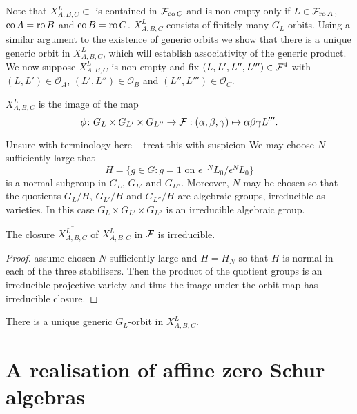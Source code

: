 \documentclass[a4paper, 11pt]{report}
\begin{document}
Note that $X_{A,B,C}^L\subset$ is contained in $\mathcal{F}_{\operatorname{co}{C}}$ and is non-empty only if $L\in\mathcal{F}_{\operatorname{ro}{A}}$, $\operatorname{co}{A}=\operatorname{ro}{B}$ and $\operatorname{co}{B}=\operatorname{ro}{C}$. $X_{A,B,C}^L$ consists of finitely many $G_L$-orbits. Using a similar argument to the existence of generic orbits we show that there is a unique generic orbit in $X_{A,B,C}^L$, which will establish associativity of the generic product. We now suppose $X_{A,B,C}^L$ is non-empty and fix $(L,L',L'',L''')\in\mathcal{F}^4$ with $(L,L')\in\mathcal{O}_A$, $(L',L'')\in\mathcal{O}_B$ and $(L'',L''')\in\mathcal{O}_C$.

\begin{lemma}
$X_{A,B,C}^L$ is the image of the map
\begin{equation*}
\phi\colon G_L\times G_{L'}\times G_{L''}\to \mathcal{F}: (\alpha,\beta,\gamma)\mapsto \alpha\beta\gamma L'''.
\end{equation*}
\end{lemma}

\begin{lemma}
{\color{red} Unsure with terminology here -- treat this with suspicion}
We may choose $N$ sufficiently large that
\begin{equation*}
H = \{g\in G: g=1 \text{ on } \epsilon^{-N}L_0/{\epsilon^N L_0}\}
\end{equation*}
is a normal subgroup in $G_L$, $G_{L'}$ and $G_{L''}$. Moreover, $N$ may be chosen so that the quotients $G_L/H$, $G_{L'}/H$ and $G_{L''}/H$ are algebraic groups, irreducible as varieties. In this case $G_L\times G_{L'}\times G_{L''}$ is an irreducible algebraic group.
\end{lemma}

\begin{proposition}
The closure $\overline{X_{A,B,C}^L}$ of $X_{A,B,C}^L$ in $\mathcal{F}$ is irreducible.
\end{proposition}
\begin{proof}
{\color{red} assume chosen $N$ sufficiently large and $H=H_N$ so that $H$ is normal in each of the three stabilisers. Then the product of the quotient groups is an irreducible projective variety and thus the image under the orbit map has irreducible closure.}
\end{proof}

\begin{proposition}
There is a unique generic $G_L$-orbit in $X_{A,B,C}^L$.
\end{proposition}

\chapter{A realisation of affine zero Schur algebras}
\end{document}
